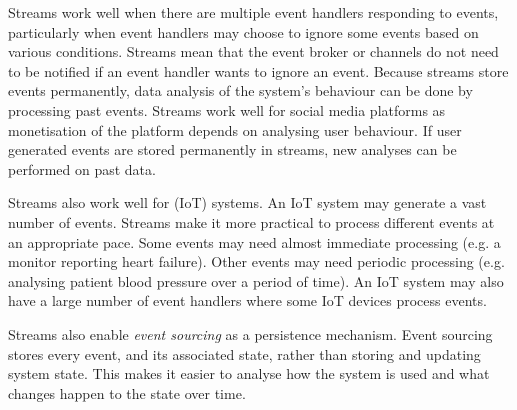 Streams work well when there are multiple event handlers responding to events,
particularly when event handlers may choose to ignore some events based on various conditions.
Streams mean that the event broker or channels do not need to be notified if an event handler wants to ignore an event.
Because streams store events permanently, data analysis of the system's behaviour can be done by processing past events.
Streams work well for social media platforms as monetisation of the platform depends on analysing user behaviour.
If user generated events are stored permanently in streams, new analyses can be performed on past data.

Streams also work well for  (IoT) systems.
An IoT system may generate a vast number of events.
Streams make it more practical to process different events at an appropriate pace.
Some events may need almost immediate processing (e.g. a monitor reporting heart failure).
Other events may need periodic processing (e.g. analysing patient blood pressure over a period of time).
An IoT system may also have a large number of event handlers where some IoT devices process events.

Streams also enable \emph{event sourcing} as a persistence mechanism.
Event sourcing stores every event, and its associated state, rather than storing and updating system state.
This makes it easier to analyse how the system is used and what changes happen to the state over time.

%
%


